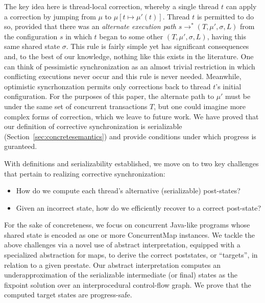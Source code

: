 The key idea here is thread-local correction, whereby a single
thread $t$ can apply a correction by jumping from $\mu$ to
$\mu[t \mapsto \mu'(t)]$. Thread $t$ is permitted to do so,
  provided that there was an \emph{alternate execution path}
  $s \rightarrow^{*} (T,\mu',\sigma,L)$ from the configuration $s$
  in which $t$ began to some other $(T,\mu',\sigma,L)$, having this
  same shared state $\sigma$.
%
This rule is fairly simple yet has significant consequences and, to
the best of our knowledge, nothing like this exists in the
literature. One can think of pessimistic synchronization as an almost
trivial restriction in which conflicting executions never occur and
this rule is never needed. Meanwhile, optimistic syncrhonzation
permits only corrections back to thread $t$'s initial
configuration.
%
For the purposes of this paper, the alternate path to
$\mu'$ must be under the same set of concurrent transactions $T$,
but one could imagine more complex forms of correction, which we
leave to future work.
%
We have proved that our definition of corrective synchronization is serializable
(Section~\ref{sec:concretesemantics}) and provide conditions
under which progress is guranteed.

%
With definitions and serializability established, we move on to two key challenges
that pertain to realizing corrective synchronization:
\begin{itemize}
\item How do we compute each thread's alternative (serializable) post-states?
\item Given an incorrect state, how do we efficiently recover to a correct post-state?
\end{itemize}
%
For the sake of concreteness, we focus on concurrent Java-like
programs whose shared state is encoded as one or more {\sf
  ConcurrentMap} instances.  We tackle the above challenges via a
novel use of abstract interpretation, equipped with a specialized
abstraction for maps, to derive the correct poststates, or ``targets'', in relation to
a given prestate.
%
Our abstract interpretation computes an
underapproximation of the serializable intermediate (or final) states
as the fixpoint solution over an interprocedural control-flow graph.
%
We prove that the computed target states are progress-safe.
%

%

